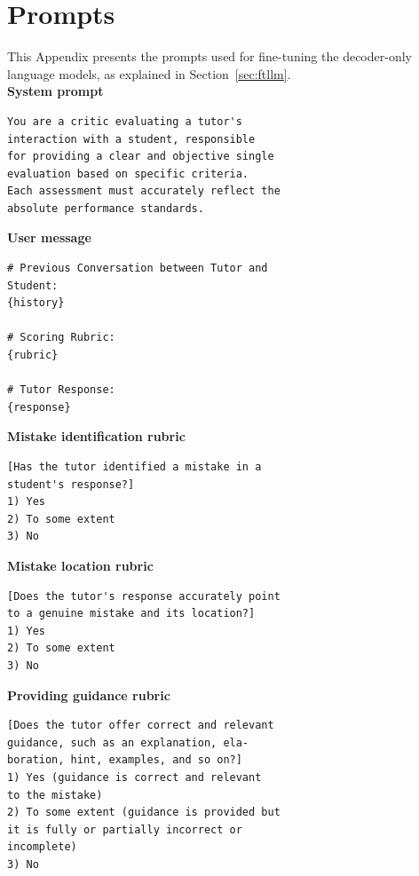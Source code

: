 \documentclass[11pt]{article}
\begin{document}
\appendix

\section{Prompts}
\label{sec:appendix_prompts}

This Appendix presents the prompts used for fine-tuning the decoder-only language models, as explained in Section~\ref{sec:ftllm}.\\
 
\noindent\textbf{System prompt}

\begin{verbatim}
You are a critic evaluating a tutor's 
interaction with a student, responsible
for providing a clear and objective single
evaluation based on specific criteria.
Each assessment must accurately reflect the 
absolute performance standards.
\end{verbatim}

\noindent\textbf{User message}

\begin{verbatim}
# Previous Conversation between Tutor and
Student:
{history}

# Scoring Rubric:
{rubric}

# Tutor Response:
{response}
\end{verbatim}

\noindent\textbf{Mistake identification rubric}

\begin{verbatim}
[Has the tutor identified a mistake in a 
student's response?]
1) Yes
2) To some extent
3) No
\end{verbatim}

\noindent\textbf{Mistake location rubric}

\begin{verbatim}
[Does the tutor's response accurately point
to a genuine mistake and its location?]
1) Yes
2) To some extent
3) No
\end{verbatim}

\noindent\textbf{Providing guidance rubric}

\begin{verbatim}
[Does the tutor offer correct and relevant
guidance, such as an explanation, ela-
boration, hint, examples, and so on?]
1) Yes (guidance is correct and relevant
to the mistake)
2) To some extent (guidance is provided but
it is fully or partially incorrect or 
incomplete)
3) No
\end{verbatim}
\end{document}
